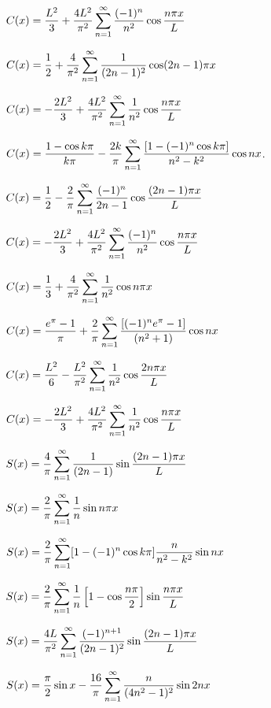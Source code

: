 \medskip

$C(x)=\displaystyle\frac{L^{2}}{3}+\frac{4L^{2}}{\pi^{2}}\sum_{n=1}^{\infty}\frac{(-1)^{n}}{n^{2}}\cos\frac{n\pi x}{L}$

$C(x)=\displaystyle\frac{1}{2}+\frac{4}{\pi^{2}}\sum_{n=1}^{\infty}\frac{1}{(2n-1)^{2}}
\cos(2n-1)\pi x$

$C(x)=\displaystyle-\frac{2L^{2}}{3}+\frac{4L^{2}}{\pi^{2}}\sum_{n=1}^{\infty}\frac{1}{n^{2}}\cos\frac{n\pi x}{L}$

$C(x)=\displaystyle\frac{1-\cos k\pi}{k\pi}-\frac{2k}{\pi}\sum_{n=1}^{\infty}
\frac{[1-(-1)^{n}\cos k\pi]}{n^{2}-k^{2}}\cos nx$.

 $C(x)=\displaystyle\frac{1}{2}-\frac{2}{\pi}\sum_{n=1}^{\infty}
\frac{(-1)^{n}}{2n-1}\cos\frac{(2n-1)\pi x}{L}$

$C(x)=\displaystyle-\frac{2L^{2}}{3}+\frac{4L^{2}}{\pi^{2}}\sum_{n=1}^{\infty}\frac{(-1)^{n}}{n^{2}}\cos\frac{n\pi x}{L}$

$C(x)=\displaystyle\frac{1}{3}+\frac{4}{\pi^{2}}\sum_{n=1}^{\infty}\frac{1}{n^{2}}\cos
n\pi x$

$C(x)=\displaystyle\frac{e^{\pi}-1}{\pi}+\frac{2}{\pi}\sum_{n=1}^{\infty}
\frac{[(-1)^{n}e^{\pi}-1]}{(n^{2}+1)}\cos nx$

$\displaystyle C(x)=\frac{L^{2}}{6}-\frac{L^{2}}{\pi^{2}}\sum_{n=1}^{\infty}\frac{1}{n^{2}}\cos\frac{2n\pi x}{L}$

$C(x)=\displaystyle-\frac{2L^{2}}{3}+\frac{4L^{2}}{\pi^{2}}\sum_{n=1}^{\infty}\frac{1}{n^{2}}\cos\frac{n\pi x}{L}$

$S(x)=\displaystyle\frac{4}{\pi}\sum_{n=1}^{\infty}\frac{1}{(2n-1)}
\sin\frac{(2n-1)\pi x}{L}$

$S(x)=\displaystyle\frac{2}{\pi}\sum_{n=1}^{\infty}\frac{1}{n}
\sin n\pi x$

$S(x)=\displaystyle\frac{2}{\pi}\sum_{n=1}^{\infty}
[1-(-1)^{n}\cos k\pi]{\frac{n}{n^{2}-k^{2}}}\sin nx$

$S(x)=\displaystyle\frac{2}{\pi}\sum_{n=1}^{\infty}\frac{1}{n}
\left[1-\cos\frac{n\pi}{2}\right]\sin\frac{n\pi x}{L}$

$S(x)=\displaystyle\frac{4L}{\pi^{2}}\sum_{n=1}^{\infty}\frac{(-1)^{n+1}}{(2n-1)^{2}}
\sin\frac{(2n-1)\pi x}{L}$

$S(x)=\displaystyle\frac{\pi}{2}\sin
x-\frac{16}{\pi}\sum_{n=1}^{\infty}\frac{n}{(4n^{2}-1)^{2}}\sin2nx$

